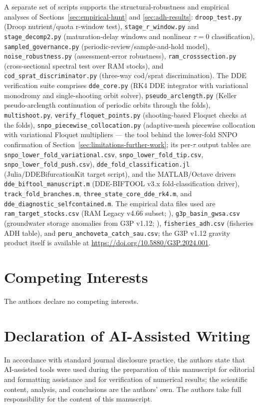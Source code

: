 \documentclass[twocolumn,10pt]{article}
\begin{document}
A separate set of scripts supports the structural-robustness and empirical analyses of Sections~\ref{sec:empirical-hunt} and \ref{sec:adh-results}: \texttt{droop\_test.py} (Droop nutrient/quota r-window test), \texttt{stage\_r\_window.py} and \texttt{stage\_decomp2.py} (maturation-delay windows and nonlinear $\tau=0$ classification), \texttt{sampled\_governance.py} (periodic-review/sample-and-hold model), \texttt{noise\_robustness.py} (assessment-error robustness), \texttt{ram\_crosssection.py} (cross-sectional spectral test over RAM stocks), and \texttt{cod\_sprat\_discriminator.py} (three-way cod/sprat discrimination). The DDE verification suite comprises \texttt{dde\_core.py} (RK4 DDE integrator with variational monodromy and single-shooting orbit solver), \texttt{pseudo\_arclength.py} (Keller pseudo-arclength continuation of periodic orbits through the folds), \texttt{multishoot.py}, \texttt{verify\_floquet\_points.py} (shooting-based Floquet checks at the folds), \texttt{snpo\_piecewise\_collocation.py} (adaptive-mesh piecewise collocation with variational Floquet multipliers --- the tool behind the lower-fold SNPO confirmation of Section~\ref{sec:limitations-further-work}; its per-$\tau$ output tables are \texttt{snpo\_lower\_fold\_variational.csv}, \texttt{snpo\_lower\_fold\_tip.csv}, \texttt{snpo\_lower\_fold\_push.csv}), \texttt{dde\_fold\_classification.jl} (Julia/DDEBifurcationKit target script), and the MATLAB/Octave drivers \texttt{dde\_biftool\_manuscript.m} (DDE-BIFTOOL v3.x fold-classification driver), \texttt{track\_fold\_branches.m}, \texttt{three\_state\_core\_dde\_rk4.m}, and \texttt{dde\_diagnostic\_selfcontained.m}. The empirical data files used are \texttt{ram\_target\_stocks.csv} (RAM Legacy v4.66 subset; \cite{ricard2012}), \texttt{g3p\_basin\_gwsa.csv} (groundwater storage anomalies from G3P v1.12; \cite{guentner2024}), \texttt{fisheries\_adh.csv} (fisheries ADH table), and \texttt{peru\_anchoveta\_catch\_sau.csv}; the G3P v1.12 gravity product itself is available at \url{https://doi.org/10.5880/G3P.2024.001}.

\section*{Competing Interests}
The authors declare no competing interests.

\section*{Declaration of AI-Assisted Writing} In accordance with standard journal disclosure practice, the authors state that AI-assisted tools were used during the preparation of this manuscript for editorial and formatting assistance and for verification of numerical results; the scientific content, analysis, and conclusions are the authors' own. The authors take full responsibility for the content of this manuscript.
\end{document}

